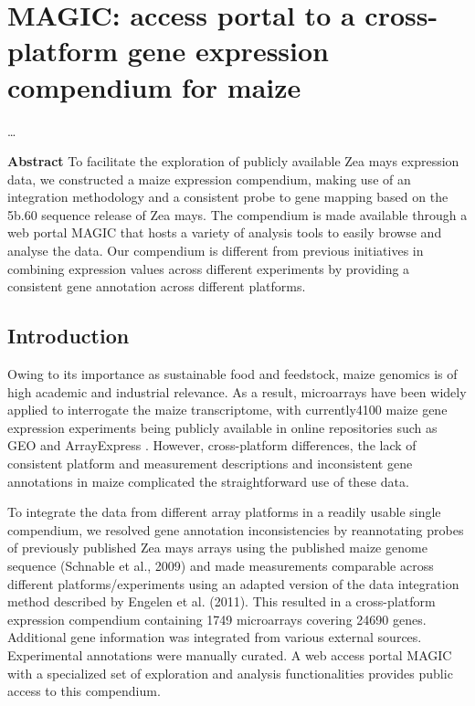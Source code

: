 \chapter{MAGIC: access portal to a cross-platform gene expression compendium for maize}\label{ch:magic}

\ldots

\instructionsintroduction

\textbf{Abstract}
To facilitate the exploration of publicly available Zea mays
expression data, we constructed a maize expression compendium,
making use of an integration methodology and a consistent probe to
gene mapping based on the 5b.60 sequence release of Zea mays. The
compendium is made available through a web portal MAGIC that
hosts a variety of analysis tools to easily browse and analyse the
data. Our compendium is different from previous initiatives in combining 
expression values across different experiments by providing a consistent 
gene annotation across different platforms.



\section{Introduction}
Owing to its importance as sustainable food and feedstock,
maize genomics is of high academic and industrial relevance.
As a result, microarrays have been widely applied to interrogate
the maize transcriptome, with currently4100 maize gene expression 
experiments being publicly available in online repositories
such as GEO \cite{Barrett2011} and ArrayExpress \cite{Parkinson2009}. 
However, cross-platform differences, the lack of
consistent platform and measurement descriptions and inconsistent 
gene annotations in maize complicated the straightforward
use of these data.

To integrate the data from different array platforms in a readily 
usable single compendium, we resolved gene annotation
inconsistencies by reannotating probes of previously published
Zea mays arrays using the published maize genome sequence
(Schnable et al., 2009) and made measurements comparable
across different platforms/experiments using an adapted version
of the data integration method described by Engelen et al. (2011).
This resulted in a cross-platform expression compendium containing 
1749 microarrays covering 24690 genes. Additional
gene information was integrated from various external sources.
Experimental annotations were manually curated. A web access
portal MAGIC with a specialized set of exploration and analysis
functionalities provides public access to this compendium.


